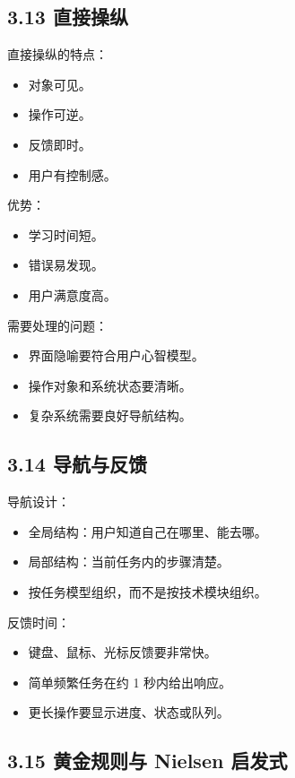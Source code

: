 \documentclass[UTF8,zihao=-4]{ctexart}
\begin{document}
\subsection{3.13 直接操纵}

直接操纵的特点：

\begin{itemize}
\item 对象可见。
\item 操作可逆。
\item 反馈即时。
\item 用户有控制感。
\end{itemize}

优势：

\begin{itemize}
\item 学习时间短。
\item 错误易发现。
\item 用户满意度高。
\end{itemize}

需要处理的问题：

\begin{itemize}
\item 界面隐喻要符合用户心智模型。
\item 操作对象和系统状态要清晰。
\item 复杂系统需要良好导航结构。
\end{itemize}

\subsection{3.14 导航与反馈}

导航设计：

\begin{itemize}
\item 全局结构：用户知道自己在哪里、能去哪。
\item 局部结构：当前任务内的步骤清楚。
\item 按任务模型组织，而不是按技术模块组织。
\end{itemize}

反馈时间：

\begin{itemize}
\item 键盘、鼠标、光标反馈要非常快。
\item 简单频繁任务在约 1 秒内给出响应。
\item 更长操作要显示进度、状态或队列。
\end{itemize}

\subsection{3.15 黄金规则与 Nielsen 启发式}
\end{document}
